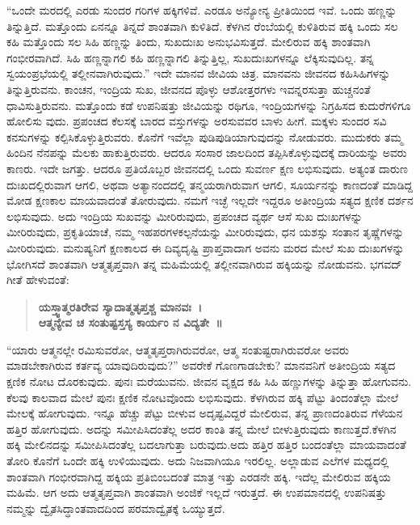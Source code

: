 “ಒಂದೇ ಮರದಲ್ಲಿ ಎರಡು ಸುಂದರ ಗರಿಗಳ ಹಕ್ಕಿಗಳಿವೆ. ಎರಡೂ ಅನ್ಯೋನ್ಯ ಪ್ರೀತಿಯಿಂದ ಇವೆ. ಒಂದು ಹಣ್ಣನ್ನು ತಿನ್ನುತ್ತಿದೆ. ಮತ್ತೊಂದು ಏನನ್ನೂ ತಿನ್ನದೆ ಶಾಂತವಾಗಿ ಕುಳಿತಿದೆ. ಕೆಳಗಿನ ರೆಂಬೆಯಲ್ಲಿ ಕುಳಿತಿರುವ ಹಕ್ಕಿ ಒಂದು ಸಲ ಕಹಿ ಮತ್ತೊಂದು ಸಲ ಸಿಹಿ ಹಣ್ಣನ್ನು ತಿಂದು, ಸುಖದುಃಖ ಅನುಭವಿಸುತ್ತದೆ. ಮೇಲಿರುವ ಹಕ್ಕಿ ಶಾಂತವಾಗಿ ಗಂಭೀರವಾಗಿದೆ. ಸಿಹಿ ಹಣ್ಣನ್ನಾಗಲಿ ಕಹಿ ಹಣ್ಣನ್ನಾಗಲಿ ತಿನ್ನುತ್ತಿಲ್ಲ, ಸುಖದುಃಖಗಳನ್ನೂ ಲೆಕ್ಕಿಸುವುದಿಲ್ಲ. ತನ್ನ ಸ್ವಯಂಪ್ರಭೆಯಲ್ಲಿ ತಲ್ಲೀನವಾಗಿರುವುದು.” ಇದೇ ಮಾನವ ಜೀವಿಯ ಚಿತ್ರ. ಮಾನವನು ಜೀವನದ ಕಹಿಸಿಹಿಗಳನ್ನು ತಿನ್ನುತ್ತಿರುವನು. ಕಾಂಚನ, ಇಂದ್ರಿಯ ಸುಖ, ಜೀವನದ ಪೊಳ್ಳು ಆಶೋತ್ತರಗಳು ಇವನ್ನರಸುತ್ತಾ ಹುಚ್ಚನಂತೆ ಧಾವಿಸುತ್ತಿರುವನು. ಮತ್ತೊಂದು ಕಡೆ ಉಪನಿಷತ್ತು ಜೀವಿಯನ್ನು ರಥಿಗೂ, ಇಂದ್ರಿಯಗಳನ್ನು ನಿಗ್ರಹಿಸದ ಕುದುರೆಗಳಿಗೂ ಹೋಲಿಸು ವುದು. ಪ್ರಪಂಚದ ಕೆಲಸಕ್ಕೆ ಬಾರದ ವಸ್ತುಗಳನ್ನು ಅರಸುವವರ ಬಾಳು ಹೀಗೆ. ಮಕ್ಕಳು ಸುಂದರ ಸವಿ ಕನಸುಗಳನ್ನು ಕಲ್ಪಿಸಿಕೊಳ್ಳುತ್ತಿರುವರು. ಕೊನೆಗೆ ಇವೆಲ್ಲಾ ಪುಡಿಪುಡಿಯಾಗುವುದನ್ನು ನೋಡುವರು. ಮುದುಕರು ತಮ್ಮ ಹಿಂದಿನ ನೆನಪನ್ನು ಮೆಲಕು ಹಾಕುತ್ತಿರುವರು. ಆದರೂ ಸಂಸಾರ ಜಾಲದಿಂದ ತಪ್ಪಿಸಿಕೊಳ್ಳುವುದಕ್ಕೆ ದಾರಿಯನ್ನು ಅವರು ಕಾಣರು. ಇದೇ ಜಗತ್ತು. ಆದರೂ ಪ್ರತಿಯೊಬ್ಬರ ಜೀವನದಲ್ಲಿ ಒಂದು ಸುವರ್ಣ ಕ್ಷಣ ಲಭಿಸುವುದು. ಅತ್ಯಂತ ದಾರುಣ ದುಃಖದಲ್ಲಿರುವಾಗ ಆಗಲಿ, ಅಥವಾ ಅತ್ಯಾನಂದದಲ್ಲಿ ತನ್ಮಯರಾಗಿರುವಾಗ ಆಗಲಿ, ಸೂರ್ಯನನ್ನು ಕಾಣದಂತೆ ಮಾಡಿದ್ದ ಮೋಡ ಕ್ಷಣಕಾಲ ಮಾಯವಾದಂತೆ ತೋರುವುದು. ನಮಗೆ ಇಚ್ಛೆ ಇಲ್ಲದೇ ಇದ್ದರೂ ಅತೀಂದ್ರಿಯ ಸತ್ಯದ ಕ್ಷಣಿಕ ದರ್ಶನ ಲಭಿಸುವುದು. ಅದು ಇಂದ್ರಿಯ ಸುಖವನ್ನು ಮೀರಿರುವುದು, ಪ್ರಪಂಚದ ವ್ಯರ್ಥ ಆಸೆ ಸುಖ ದುಃಖಗಳನ್ನು ಮೀರಿರುವುದು, ಪ್ರಕೃತಿಯಾಚೆ, ನಮ್ಮ ಇಹಪರಗಳ\break ಕಲ್ಪನೆಯನ್ನು ಮೀರಿರುವುದು, ಧನ ಯಶಸ್ಸು ಸಂತಾನ ತೃಷ್ಣೆಗಳನ್ನು ಮೀರಿರುವುದು. ಮನುಷ್ಯನಿಗೆ ಕ್ಷಣಕಾಲದ ಈ ದಿವ್ಯದೃಷ್ಟಿ ಪ್ರಾಪ್ತವಾದಾಗ ಅವನು ಮರದ ಮೇಲೆ ಸುಖ ದುಃಖಗಳನ್ನು ಭೋಗಿಸದೆ ಶಾಂತವಾಗಿ ಆತ್ಮತೃಪ್ತವಾಗಿ ತನ್ನ ಮಹಿಮೆಯಲ್ಲಿ ತಲ್ಲೀನವಾಗಿರುವ ಹಕ್ಕಿಯನ್ನು ನೋಡುವನು. ಭಗವದ್​ಗೀತೆ ಹೇಳುವಂತೆ:

\begin{verse}
\textbf{ಯಸ್ತ್ವಾತ್ಮರತಿರೇವ ಸ್ಯಾದಾತ್ಮತೃಪ್ತಶ್ಚ ಮಾನವಃ~।}\\\textbf{ಆತ್ಮನ್ಯೇವ ಚ ಸಂತುಷ್ಟಸ್ತಸ್ಯ ಕಾರ್ಯಂ ನ ವಿದ್ಯತೇ~॥}
\end{verse}

“ಯಾರು ಆತ್ಮನಲ್ಲೇ ರಮಿಸುವರೋ, ಆತ್ಮತೃಪ್ತರಾಗಿರುವರೋ, ಆತ್ಮ ಸಂತುಷ್ಟರಾಗಿರುವರೋ ಅವರು ಮಾಡಬೇಕಾಗಿರುವ ಕರ್ತವ್ಯ ಯಾವುದಿರುವುದು?” ಅವರೇಕೆ ಗೊಣಗಾಡಬೇಕು? ಮಾನವನಿಗೆ ಅತೀಂದ್ರಿಯ ಸತ್ಯದ ಕ್ಷಣಿಕ ನೋಟ ದೊರಕುವುದು. ಪುನಃ ಮರೆಯುವನು. ಜೀವನ ವೃಕ್ಷದ ಕಹಿ ಸಿಹಿ ಹಣ್ಣುಗಳನ್ನು ತಿನ್ನುತ್ತಾ ಹೋಗುವನು. ಕೆಲವು ಕಾಲವಾದ ಮೇಲೆ ಪುನಃ ಕ್ಷಣಿಕ ನೋಟವೊಂದು ಲಭಿಸುವುದು. ಕೆಳಗಿರುವ ಹಕ್ಕಿ ಪೆಟ್ಟು ತಿಂದಂತೆಲ್ಲಾ ಮೇಲೆ ಮೇಲಕ್ಕೆ ಹೋಗುವುದು. ಇನ್ನೂ ಹೆಚ್ಚು ಪೆಟ್ಟು ಬೀಳುವ ಅದೃಷ್ಟವಿದ್ದರೆ ಮೇಲಿರುವ, ತನ್ನ ಪ್ರಾಣದಂತಿರುವ ಗೆಳೆಯನ ಹತ್ತಿರ ಹೋಗುವುದು. ಅದನ್ನು ಸಮೀಪಿಸಿದಂತೆಲ್ಲ ಅದರ ಕಾಂತಿ ತನ್ನ ಮೇಲೆ ಬೀಳುತ್ತಿರುವುದು ಕಾಣುತ್ತದೆ.\break ಕೆಳಗಿನ ಹಕ್ಕಿ ಮೇಲಿನದನ್ನು ಸಮೀಪಿಸಿದಂತೆಲ್ಲ ಬದಲಾಗುತ್ತಾ ಬರುವುದು.\break ಅದು ಹತ್ತಿರ ಹತ್ತಿರ ಬಂದಂತೆಲ್ಲಾ ಮಾಯವಾದಂತೆ ತೋರಿ ಕೊನೆಗೆ ಒಂದೇ ಹಕ್ಕಿ ಉಳಿಯುವುದು. ಅದು ನಿಜವಾಗಿಯೂ ಇರಲಿಲ್ಲ. ಅಲ್ಲಾಡುವ ಎಲೆಗಳ ಮಧ್ಯದಲ್ಲಿ ಶಾಂತವಾಗಿ ಗಂಭೀರವಾಗಿದ್ದ ಹಕ್ಕಿಯ ಪ್ರತಿಬಿಂಬದಂತೆ ಮಾತ್ರ ಇತ್ತು ಎರಡನೇ ಹಕ್ಕಿ. ಇದೆಲ್ಲ ಮೇಲಿರುವ ಹಕ್ಕಿಯ ಮಹಿಮೆ. ಆಗ ಅದು ಆತ್ಮತೃಪ್ತವಾಗಿ ಶಾಂತವಾಗಿ ಅಂಜಿಕೆ ಇಲ್ಲದೆ ಇರುತ್ತದೆ. ಈ ಉಪಮಾನದಲ್ಲಿ ಉಪನಿಷತ್ತು ನಮ್ಮನ್ನು ದ್ವೈತಸಿದ್ಧಾಂತವಾದದಿಂದ ಪರಮಾದ್ವೈತಕ್ಕೆ ಒಯ್ಯುತ್ತದೆ.

